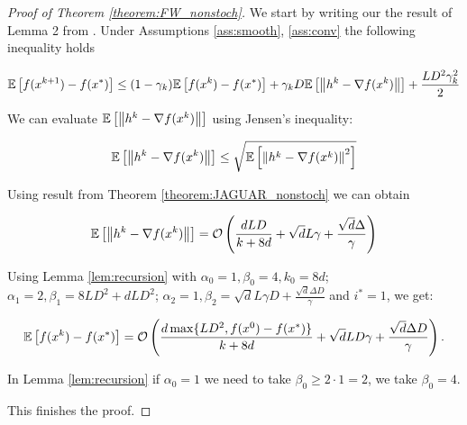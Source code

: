     \begin{proof}[Proof of Theorem \ref{theorem:FW_nonstoch}]
        We start by writing our the result of Lemma 2 from \cite{mokhtari2020stochastic}. Under Assumptions \ref{ass:smooth}, \ref{ass:conv} the following inequality holds

        \begin{equation*}
            \mathbb{E}\left[ f(x^{k+1}) - f(x^*) \right] \leq (1 - \gamma_k) \mathbb{E}\left[ f(x^{k}) - f(x^*) \right] + \gamma_k D \mathbb{E}\left[ \left\| h^k - \nabla f(x^k) \right\| \right] + \frac{L D^2 \gamma_k^2}{2}
        \end{equation*}

        We can evaluate $\mathbb{E}\left[ \left\| h^k - \nabla f(x^k) \right\| \right]$ using Jensen’s inequality:

        \begin{equation*}
            \mathbb{E}\left[ \left\| h^k - \nabla f(x^k) \right\| \right] \leq \sqrt{\mathbb{E}\left[ \left\| h^k - \nabla f(x^k) \right\|^2 \right]}
        \end{equation*}

        Using result from Theorem \ref{theorem:JAGUAR_nonstoch} we can obtain

        \begin{equation*}
            \mathbb{E}\left[ \left\| h^k - \nabla f(x^k) \right\| \right] 
            = 
            \mathcal{O} \left( \frac{d L D}{k + 8d} +
            \sqrt{d} L \gamma + \frac{\sqrt{d} \Delta}{\gamma} \right)
        \end{equation*}

        Using Lemma \ref{lem:recursion} with $\alpha_0 = 1, \beta_0 = 4, k_0 = 8d$;
        $\alpha_1 = 2, \beta_1 = 8 L D^2 + d L D^2$;
        $\alpha_2 = 1, \beta_2 = \sqrt{d} L \gamma D + \frac{\sqrt{d} \Delta D}{\gamma}$ and $i^* = 1$, we get:

        \begin{equation*}
            \mathbb{E}\left[ f(x^{k}) - f(x^*) \right] 
            =
            \mathcal{O} \left( \frac{d \max\{L D^2, f(x^0) - f(x^*)\}}{k + 8d}
            + \sqrt{d} L D \gamma + \frac{\sqrt{d} \Delta D}{\gamma}\right).
        \end{equation*}

        In Lemma \ref{lem:recursion} if $\alpha_0 = 1$ we need to take $\beta_0 \geq 2 \cdot 1 = 2$, we take $\beta_0 = 4$.


        This finishes the proof.
    \end{proof}

